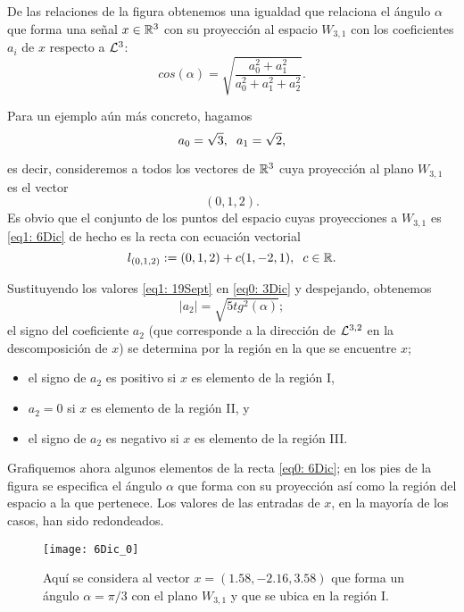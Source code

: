 \begin{ejemplo}
\begin{itemize}
De las relaciones de la figura 
obtenemos una igualdad que relaciona el ángulo 
$\alpha$ que forma una señal $x \in \mathbb{R}^{3}$ 
con su proyección al espacio $W_{3,1}$
con los coeficientes $a_{i}$
de $x$ respecto a $\mathcal{L}^{3}$:
\begin{equation}
\label{eq0: 3Dic}
cos(\alpha)= \sqrt{\frac{a_{0}^{2}+a_{1}^{2}}{a_{0}^{2}+a_{1}^{2}+a_{2}^{2}}}.
\end{equation}

Para un ejemplo aún más concreto, hagamos 
\begin{equation}
\label{eq1: 19Sept}
a_{0}= \sqrt{3}, \hspace{0.2cm} a_{1}= \sqrt{2},
\end{equation}



es decir, consideremos a todos los vectores de $\mathbb{R}^{3}$
cuya proyección al plano $W_{3,1}$ es 
el vector
\begin{equation}
\label{eq1: 6Dic}
(0,1,2).
\end{equation}
Es obvio que el conjunto de los puntos
del espacio cuyas proyecciones a 
$W_{3,1}$ es \eqref{eq1: 6Dic} de hecho es la recta
con ecuación vectorial
\begin{equation}
\label{eq0: 6Dic}
l_{(0,1,2)} := (0,1,2)+c(1,-2,1), \hspace{0.2cm} c \in \mathbb{R}.
\end{equation}

Sustituyendo
los valores \eqref{eq1: 19Sept} en \eqref{eq0: 3Dic} y
despejando, obtenemos 
\[
|a_{2}|= \sqrt{5 tg^{2}(\alpha)};
\]
el signo del coeficiente $a_{2}$ (que corresponde a la dirección
de $\mathcal{L}^{3,2}$ en la descomposición de $x$) se determina por
la región en la que se encuentre $x$;

\begin{itemize}
\item el signo de $a_{2}$ es positivo si $x$ es elemento de la región I,
\item $a_{2}=0$ si $x$ es elemento de la región II, y
\item el signo de $a_{2}$ es negativo si $x$ es elemento de la región III.
\end{itemize}


Grafiquemos ahora algunos elementos
de la recta \eqref{eq0: 6Dic}; en los pies
de la figura se especifica el ángulo
$\alpha$ que forma con su proyección así
como la región del espacio a la que pertenece.
Los valores de las entradas de $x$, en la
mayoría de los casos, han sido redondeados.
\end{itemize}
\begin{figure}[H]
\centering\captionsetup{format = hang}
	\begin{measuredfigure}
		\texttt{[image: 6Dic\_0]} 
		\caption{Aquí se considera al vector 
		$x=(1.58, -2.16,3.58)$ que forma un ángulo $\alpha=\pi/3$
		con el plano $W_{3,1}$ y que se ubica en la región I.
		}
 	\end{measuredfigure}
 \end{figure}



\end{ejemplo}
